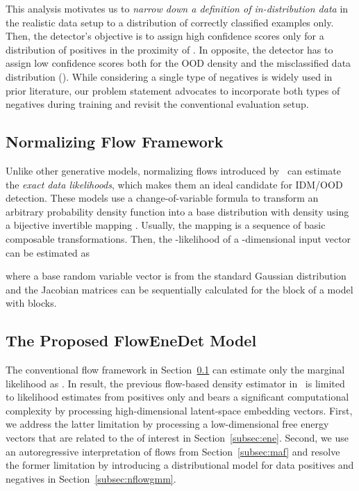 \documentclass[accepted, startpage]{uai2023}
\begin{document}
This analysis motivates us to \textit{narrow down a definition of in-distribution data} in the realistic data setup to a distribution of correctly classified examples only. Then, the detector's objective is to assign high confidence scores only for a distribution of positives in the proximity of . In opposite, the detector has to assign low confidence scores both for the OOD density  and the misclassified data distribution (). While considering a single type of negatives is widely used in prior literature, our problem statement advocates to incorporate both types of negatives during training and revisit the conventional evaluation setup.

\subsection{Normalizing Flow Framework}\label{subsec:nflow}
Unlike other generative models, normalizing flows introduced by~\citet{rezende15} can estimate the \textit{exact data likelihoods}, which makes them an ideal candidate for IDM/OOD detection. These models use a change-of-variable formula to transform an arbitrary probability density function  into a base distribution with  density using a bijective invertible mapping . Usually, the mapping  is a sequence of basic composable transformations. Then, the -likelihood of a -dimensional input vector  can be estimated as

where a base random variable vector  is from the standard Gaussian distribution  and the Jacobian matrices  can be sequentially calculated for the  block of a model  with  blocks.

\subsection{The Proposed FlowEneDet Model}\label{subsec:FEDmodel}
The conventional flow framework in Section~\ref{subsec:nflow} can estimate only the marginal likelihood as . In result, the previous flow-based density estimator in~\citep{fishyscapes} is limited to likelihood estimates from positives only and bears a significant computational complexity by processing high-dimensional latent-space embedding vectors. First, we address the latter limitation by processing a low-dimensional free energy vectors  that are related to the  of interest in Section~\ref{subsec:ene}. Second, we use an autoregressive interpretation of flows from Section~\ref{subsec:maf} and resolve the former limitation by introducing a distributional model for data positives and negatives in Section~\ref{subsec:nflowgmm}.
\end{document}
